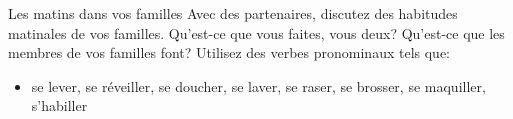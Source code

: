 \begin{frame}{Les matins dans vos familles}
  Avec des partenaires, discutez des habitudes matinales de vos familles.
  Qu'est-ce que vous faites, vous deux?
  Qu'est-ce que les membres de vos familles font?
  Utilisez des verbes pronominaux tels que:
  \begin{itemize}
    \item se lever, se réveiller, se doucher, se laver, se raser, se brosser, se maquiller, s'habiller
  \end{itemize}
\end{frame}